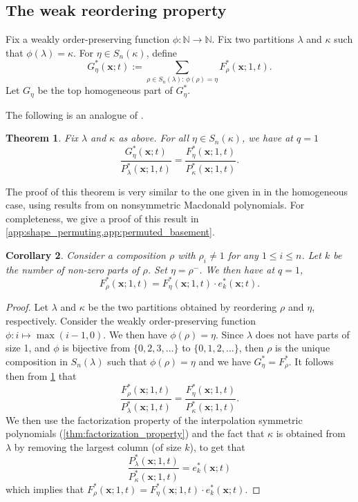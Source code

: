 \documentclass[12pt]{amsart}
\newtheorem{thm}{Theorem}[section]
\newtheorem{cor}[thm]{Corollary}
\theoremstyle{definition}
\newcommand{\bfx}{\boldsymbol{x}}
\newcommand{\NN}{\mathbb N}
\begin{document}
\subsection{The weak reordering property}
Fix a weakly order-preserving function $\phi:\NN\rightarrow\NN$.  Fix two partitions $\lambda$ and $\kappa$ such that $\phi(\lambda)=\kappa$.
For $\eta\in S_n(\kappa)$, define 
$$G^*_\eta(\bfx;t):=\sum_{\rho\in S_n(\lambda):\, \phi(\rho)=\eta} F^*_\rho(\bfx;1,t).$$ Let $G_{\eta}$ be the top homogeneous part of $G^*_\eta$.


The following is an analogue of \cite[Theorem 4.18]{AyyerMartinWilliams2025}. 
\begin{thm}\label{thm:weak-reordering}
    Fix $\lambda$ and $\kappa$ as above. For all $\eta\in S_n(\kappa)$, we have at $q=1$
    $$\frac{G^*_\eta(\bfx;t)}{P^*_\lambda(\bfx;1,t)}=\frac{F^*_\eta(\bfx;1,t)}{P^*_\kappa(\bfx;1,t)}.$$
\end{thm}
The proof of this theorem is very similar to the one given in \cite{AyyerMartinWilliams2025} in the homogeneous case, using results from \cite{AlexanderssonSawhney2019} on {nonsymmetric  Macdonald polynomials}. For completeness, we give a proof of this result in \cref{app:shape_permuting,app:permuted_basement}.

\begin{cor}\label{cor:eta_minus}
    Consider a composition $\rho$ with $\rho_i\neq 1$ for any $1\leq i\leq n$. Let $k$ be the number of non-zero parts of $\rho$. Set $\eta=\rho^-$.
    We then have at $q=1$,
$$F^*_{\rho}(\bfx;1,t)=F^*_{\eta}(\bfx;1,t)\cdot e^*_{k}(\bfx;t).$$
\end{cor}
\begin{proof}
Let $\lambda$ and $\kappa$ be the two partitions obtained by reordering $\rho$ and $\eta$, respectively.
  Consider the weakly order-preserving function $\phi:i\mapsto \max(i-1,0)$. We then have $\phi(\rho)=\eta$. Since $\lambda$ does not have parts of size 1, and $\phi$ is bijective from $\{0,2,3,\dots\}$ to $\{0,1,2,\dots\}$, then $\rho$ is the unique composition in $S_n(\lambda)$ such that $\phi(\rho)=\eta$ and we have $G^*_\eta=F^*_\rho$. It follows then from \cref{thm:weak-reordering} that
  $$\frac{F^*_{\rho}(\bfx;1,t)}{P^*_{\lambda}(\bfx;1,t)}=\frac{F^*_{\eta}(\bfx;1,t)}{P^*_{\kappa}(\bfx;1,t)}.$$
We then use the factorization property of the interpolation symmetric polynomials (\cref{thm:factorization_property}) and the fact that $\kappa$ is obtained from $\lambda$ by removing the largest column (of size $k$), to get that
$$\frac{P^*_{\lambda}(\bfx;1,t)}{P^*_{\kappa}(\bfx;1,t)}=e^*_{k}(\bfx;t)$$
which implies that $F^*_{\rho}(\bfx;1,t)=F^*_{\eta}(\bfx;1,t)\cdot e^*_{k}(\bfx;t).$
\end{proof}
\end{document}
